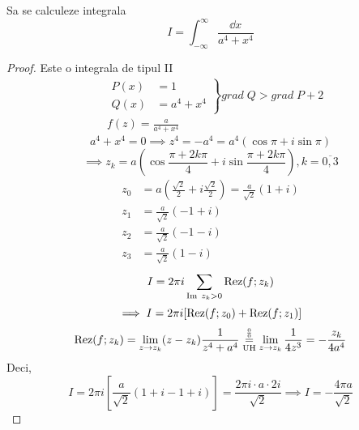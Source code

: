 
\begin{aplicatie}[1]
    Sa se calculeze integrala
    \[
    I = \int_{-\infty}^{\infty} \frac{\dd x}{a^4+x^4}
    \]
    \begin{proof}

    Este o integrala de tipul II
    \begin{align*}
        &\left .
            \begin{aligned}
                P(x) &= 1 \\
                Q(x) &= a^4 +x^4
            \end{aligned}
        \right \}
        grad\; Q > grad\; P+2 \\
        & f(z) = \frac{a}{a^4 +x^4}
    \end{align*}
    \[
        a^4 +x^4 = 0 \implies z^4 = -a^4 = a^4 (\cos \pi + i\sin \pi)
    \]
    \[
        \implies z_k = a \left( \cos \frac{\pi+2k\pi}{4} + i \sin \frac{\pi+2k\pi}{4} \right)
            , k=\overline{0,3}
    \]
    \begin{align*}
        z_0 &= a \left(\frac{\sqrt 2}{2} + i\frac{\sqrt 2}{2} \right)
            = \frac{a}{\sqrt 2} (1+i) \\
        z_1 &= \frac{a}{\sqrt 2} (-1+i) \\
        z_2 &= \frac{a}{\sqrt 2} (-1-i) \\
        z_3 &= \frac{a}{\sqrt 2} (1-i)
    \end{align*}
    \[
        I = 2 \pi i \sum_{\operatorname{Im}  \; z_k >0} \operatorname{Rez}(f;z_k)
    \]
    \[
        \implies I = 2 \pi i [\operatorname{Rez}(f;z_0) + \operatorname{Rez}(f;z_1)]
    \]
    \[
        \operatorname{Rez}(f;z_k) = \lim_{z \to z_k} (z-z_k) \frac{1}{z^4+a^4}
            \overset{\frac{0}{0}}{\underset{\mathrm{U H}}{=}}
            \lim_{z \to z_k} \frac{1}{4z^3}
            = - \frac{z_k}{4a^4}
    \]
    Deci,
    \[
        I = 2 \pi i \left[ \frac{a}{\sqrt 2} (1+i -1 +i) \right]
            = \frac{2 \pi i \cdot a \cdot 2i}{\sqrt 2}
            \implies I = - \frac{4 \pi a}{\sqrt 2}
    \]
    \end{proof}
\end{aplicatie}

